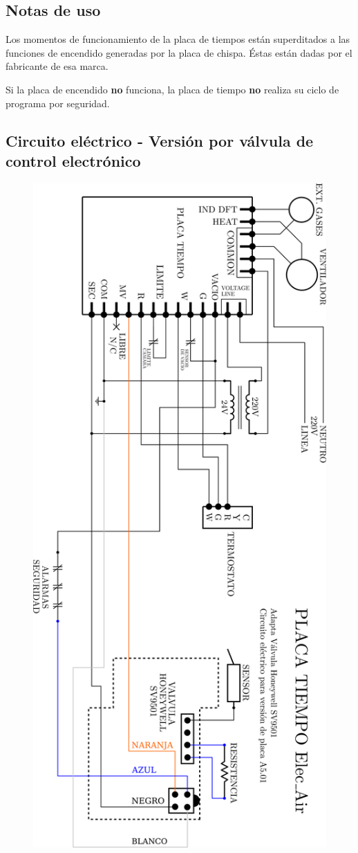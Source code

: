 \documentclass{article}
\begin{document}
\subsection*{Notas de uso}
Los momentos de funcionamiento de la placa de tiempos están superditados a las funciones de encendido generadas por la placa de chispa. Éstas están dadas por el fabricante de esa marca.\par Si la placa de encendido \textbf{no} funciona, la placa de tiempo \textbf{no} realiza su ciclo de programa por seguridad.

\newpage

\subsection*{Circuito eléctrico - Versión por válvula de control electrónico}

\begin{figure}[H]
\centering
\includegraphics[width=0.65\linewidth]{images/PlacaTiempo_PlanoValvulaV501.png}
\end{figure}
\end{document}
